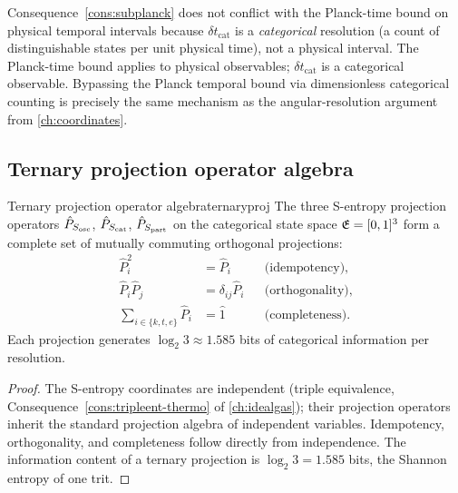 \begin{remark}
Consequence~\ref{cons:subplanck} does not conflict with the Planck-time
bound on physical temporal intervals because $\delta t_{\mathrm{cat}}$ is
a \emph{categorical} resolution (a count of distinguishable states per
unit physical time), not a physical interval.  The Planck-time bound
applies to physical observables; $\delta t_{\mathrm{cat}}$ is a
categorical observable.  Bypassing the Planck temporal bound via
dimensionless categorical counting is precisely the same mechanism as the
angular-resolution argument from \cref{ch:coordinates}.
\end{remark}

\subsection{Ternary projection operator algebra}

\begin{consequence}{Ternary projection operator algebra}{ternaryproj}
The three S-entropy projection operators $\hat{P}_{S_{\mathrm{osc}}}$, $\hat{P}_{S_{\mathrm{cat}}}$,
$\hat{P}_{S_{\mathrm{part}}}$ on the categorical state space $\mathfrak{E} = [0,1]^3$ form a
complete set of mutually commuting orthogonal projections:
\begin{align}
  \hat{P}_i^2 &= \hat{P}_i
  && \text{(idempotency),}
  \label{eq:idem}\\
  \hat{P}_i \hat{P}_j &= \delta_{ij}\hat{P}_i
  && \text{(orthogonality),}
  \label{eq:orth}\\
  \sum_{i \in \{k,t,e\}} \hat{P}_i &= \hat{1}
  && \text{(completeness).}
  \label{eq:compl}
\end{align}
Each projection generates $\log_2 3 \approx 1.585$ bits of categorical
information per resolution.
\end{consequence}

\begin{proof}
The S-entropy coordinates are independent (triple equivalence,
Consequence~\ref{cons:tripleent-thermo} of \cref{ch:idealgas}); their projection
operators inherit the standard projection algebra of independent variables.
Idempotency, orthogonality, and completeness follow directly from
independence.  The information content of a ternary projection is
$\log_2 3 = 1.585$ bits, the Shannon entropy of one trit.
\end{proof}

